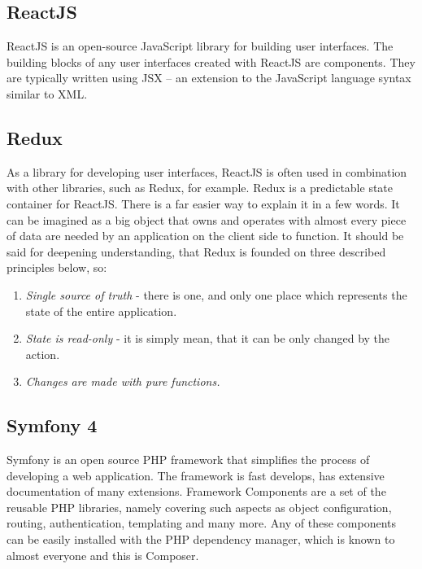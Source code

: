\documentclass[thesis=B,english]{FITthesis}[2019/03/06]
\begin{document}
\subsection{ReactJS} 
 ReactJS is an open-source JavaScript library for building user interfaces. The building blocks of any user interfaces created with ReactJS are components. They are typically written using JSX --  an extension to the JavaScript language syntax similar to XML.  

 \subsection{Redux} 
As a library for developing user interfaces, ReactJS is often used in combination with other libraries, such as Redux, for example.
Redux is a predictable state container for ReactJS.  
There is a far easier way to explain it in a few words. It can be imagined as a big object that owns and operates with almost every piece of data are needed by an application on the client side to function.
It should be said for deepening understanding, that Redux is founded on three described principles below, so:
\begin{enumerate}
 \item \textit{Single source of truth} - there is one, and only one place which represents the state of the entire application.
 \item \textit{State is read-only} - it is simply mean, that it can be only changed by the action.
 \item\textit{Changes are made with pure functions.}
\end{enumerate} 

\subsection{Symfony 4}
Symfony is an open source PHP framework that simplifies the process of developing a web application. 
The framework is fast develops, has extensive documentation of many extensions. Framework Components are a set of the reusable PHP libraries, namely covering such aspects as object configuration, routing, authentication, templating and many more.
Any of these components can be easily installed with the PHP dependency manager, which is known to almost everyone and this is Composer.
\end{document}
